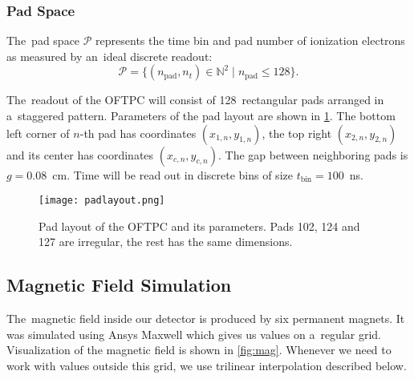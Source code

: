 			
			\subsubsection{Pad Space}
				The~pad space $\mathcal{P}$ represents the time bin and pad number of ionization electrons as measured by an~ideal discrete readout:
					\begin{equation}
						\mathcal{P} = \{(n_\text{pad},n_t)\in\mathbb{N}^2 \mid n_\text{pad}\leq128\}.
					\end{equation}
				
				The~readout of the \ac{OFTPC} will consist of 128~rectangular pads arranged in a~staggered pattern. Parameters of the pad layout are shown in \cref{fig:padlayout}. The bottom left corner of $n$\nobreakdash-th pad has coordinates $(x_{1,n},y_{1,n})$, the  top right $(x_{2,n},y_{2,n})$ and its center has coordinates $(x_{c,n},y_{c,n})$. The gap between neighboring pads is $g=0.08$~cm. Time will be read out in discrete bins of size $t_\text{bin}=100$~ns.
			
				\begin{figure}[H]
					\centering
					\texttt{[image: padlayout.png]}
					\caption{Pad layout of the \ac{OFTPC} and its parameters. Pads 102, 124 and 127 are irregular, the rest has the same dimensions.}
					\label{fig:padlayout}
				\end{figure}
		
		\subsection{Magnetic Field Simulation}
		\label{sec:mag}
			The~magnetic field inside our detector is produced by six permanent magnets. It was simulated using Ansys Maxwell which gives us values on a~regular grid. Visualization of the magnetic field is shown in \cref{fig:mag}. Whenever we need to work with values outside this grid, we use trilinear interpolation described below.
			
